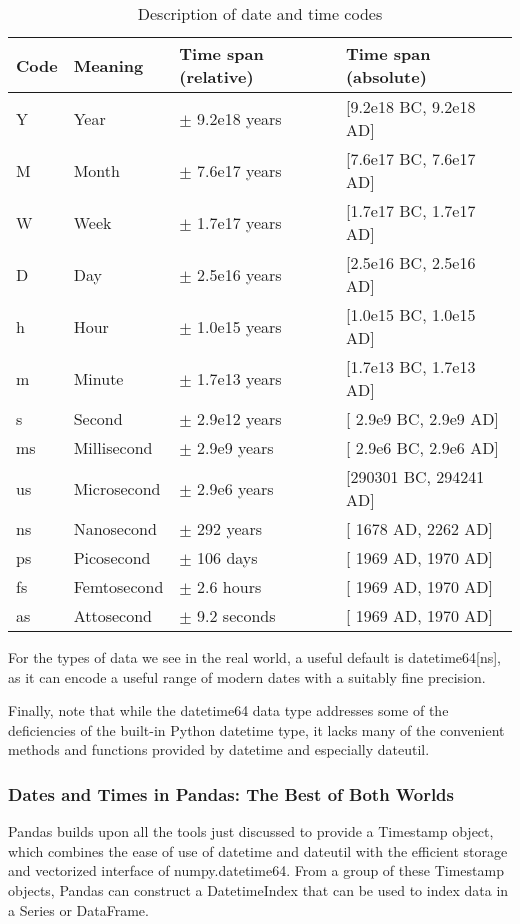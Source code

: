 \begin{table}
    \centering
    \caption{Description of date and time codes}
    \label{tab23-1}
    \begin{tabular}{llll}
        \hline
        Code & Meaning     & Time span (relative) & Time span (absolute)   \\
        \hline
        Y    & Year        & $\pm$ 9.2e18 years   & [9.2e18 BC, 9.2e18 AD] \\
        M    & Month       & $\pm$ 7.6e17 years   & [7.6e17 BC, 7.6e17 AD] \\
        W    & Week        & $\pm$ 1.7e17 years   & [1.7e17 BC, 1.7e17 AD] \\
        D    & Day         & $\pm$ 2.5e16 years   & [2.5e16 BC, 2.5e16 AD] \\
        h    & Hour        & $\pm$ 1.0e15 years   & [1.0e15 BC, 1.0e15 AD] \\
        m    & Minute      & $\pm$ 1.7e13 years   & [1.7e13 BC, 1.7e13 AD] \\
        s    & Second      & $\pm$ 2.9e12 years   & [ 2.9e9 BC, 2.9e9 AD]  \\
        ms   & Millisecond & $\pm$ 2.9e9 years    & [ 2.9e6 BC, 2.9e6 AD]  \\
        us   & Microsecond & $\pm$ 2.9e6 years    & [290301 BC, 294241 AD] \\
        ns   & Nanosecond  & $\pm$ 292 years      & [ 1678 AD, 2262 AD]    \\
        ps   & Picosecond  & $\pm$ 106 days       & [ 1969 AD, 1970 AD]    \\
        fs   & Femtosecond & $\pm$ 2.6 hours      & [ 1969 AD, 1970 AD]    \\
        as   & Attosecond  & $\pm$ 9.2 seconds    & [ 1969 AD, 1970 AD]    \\
        \hline
    \end{tabular}
\end{table}

For the types of data we see in the real world, a useful default is datetime64[ns], as it
can encode a useful range of modern dates with a suitably fine precision.

Finally, note that while the datetime64 data type addresses some of the deficiencies of
the built-in Python datetime type, it lacks many of the convenient methods and
functions provided by datetime and especially dateutil.

\subsubsection*{Dates and Times in Pandas: The Best of Both Worlds}
Pandas builds upon all the tools just discussed to provide a Timestamp object, which
combines the ease of use of datetime and dateutil with the efficient storage and
vectorized interface of numpy.datetime64. From a group of these Timestamp objects,
Pandas can construct a DatetimeIndex that can be used to index data in a Series or
DataFrame.

